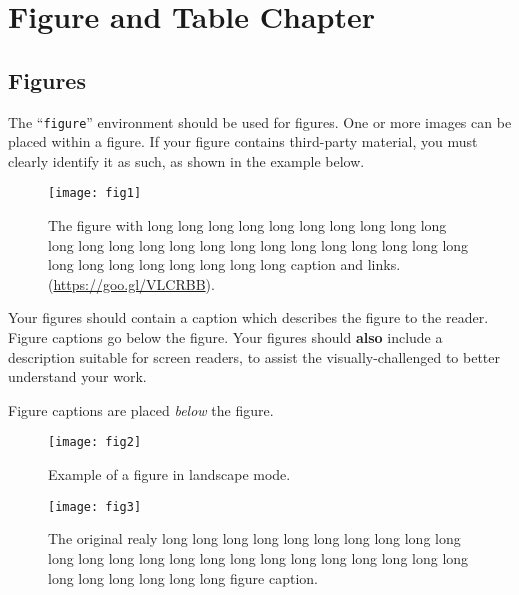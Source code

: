 \chapter{Figure and Table Chapter}
\lipsum[5]
\section{Figures}

The ``\verb|figure|'' environment should be used for figures. One or
more images can be placed within a figure. If your figure contains
third-party material, you must clearly identify it as such, as shown
in the example below.
\begin{figure}[h]
	\centering
	\texttt{[image: fig1]}
	\caption{The figure with long long long long long long long long long long long long long long long long long long long long long long long long long long long long long long long long caption and links. (\url{https://goo.gl/VLCRBB}).}
\end{figure}




Your figures should contain a caption which describes the figure to
the reader. Figure captions go below the figure. Your figures should
{\bfseries also} include a description suitable for screen readers, to
assist the visually-challenged to better understand your work.

Figure captions are placed {\itshape below} the figure.

\lipsum[1-2]

\begin{pdflandscape} %
	\begin{figure}[h]
		\centering
		\texttt{[image: fig2]}
		\caption{Example of a figure in landscape mode.}
	\end{figure}
\end{pdflandscape}



\begin{figure}[h]
	\centering
	\texttt{[image: fig3]}
	\caption[Short version caption for LoF, the original caption is really long]{The original realy long long long long long long long long long long long long long long long long long long long long long long long long long long long long long long figure caption.}
\end{figure}
